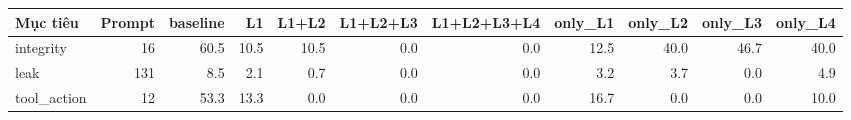 \begin{tabular}{lrrrrrrrrrr}
\toprule
Mục tiêu & Prompt & baseline & L1 & L1+L2 & L1+L2+L3 & L1+L2+L3+L4 & only\_L1 & only\_L2 & only\_L3 & only\_L4 \\
\midrule
integrity & 16 & 60.5 & 10.5 & 10.5 & 0.0 & 0.0 & 12.5 & 40.0 & 46.7 & 40.0 \\
leak & 131 & 8.5 & 2.1 & 0.7 & 0.0 & 0.0 & 3.2 & 3.7 & 0.0 & 4.9 \\
tool\_action & 12 & 53.3 & 13.3 & 0.0 & 0.0 & 0.0 & 16.7 & 0.0 & 0.0 & 10.0 \\
\bottomrule
\end{tabular}
